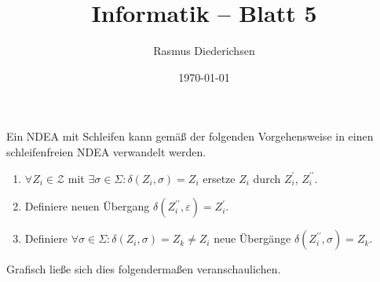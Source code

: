 \documentclass{article}
\title{Informatik \rotatebox[origin=c]{180}{D}\raisebox{2pt}{:} -- Blatt 5}
\author{Rasmus Diederichsen}
\date{\today}
\begin{document}
\maketitle

\section{} 
\subsection{} 

Ein NDEA mit Schleifen kann gem\"a\ss{} der folgenden Vorgehensweise in einen
schleifenfreien NDEA verwandelt werden.

\renewcommand{\labelenumi}{\textcolor{teal}{\arabic{enumi}.}}

\begin{enumerate}
   \item $\forall Z_i\in\mathcal{Z}$ mit $\exists\sigma\in\Sigma:
      \delta(Z_i,\sigma)=Z_i$ ersetze $Z_i$ durch $Z_i^\prime$, $Z_i^{\prime\prime}$.
   \item Definiere neuen \"Ubergang 
      $\delta(Z_i^{\prime\prime},\varepsilon)=Z_i^\prime$. 
   \item Definiere $\forall\sigma\in\Sigma:\delta(Z_i,\sigma)=Z_k\neq Z_i$ neue
      \"Uberg\"ange $\delta(Z_i^{\prime\prime},\sigma)=Z_k$.
\end{enumerate}

Grafisch lie\ss{}e sich dies folgenderma\ss{}en veranschaulichen.

\usetikzlibrary{arrows,automata,positioning,calc}
\end{document}
